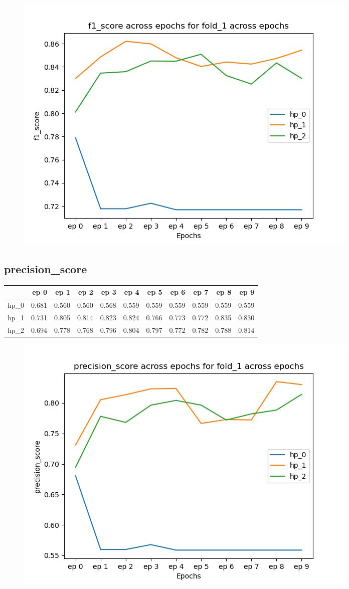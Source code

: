 \documentclass{article}
\begin{document}
\begin{figure}[H]
\includegraphics[scale = 0.75]{fold_1/f1_score}
\end{figure}
\subsection{precision\_score}
\begin{tabular}{lrrrrrrrrrr}
\toprule
{} &   ep 0 &   ep 1 &   ep 2 &   ep 3 &   ep 4 &   ep 5 &   ep 6 &   ep 7 &   ep 8 &   ep 9 \\
\midrule
hp\_0 &  0.681 &  0.560 &  0.560 &  0.568 &  0.559 &  0.559 &  0.559 &  0.559 &  0.559 &  0.559 \\
hp\_1 &  0.731 &  0.805 &  0.814 &  0.823 &  0.824 &  0.766 &  0.773 &  0.772 &  0.835 &  0.830 \\
hp\_2 &  0.694 &  0.778 &  0.768 &  0.796 &  0.804 &  0.797 &  0.772 &  0.782 &  0.788 &  0.814 \\
\bottomrule
\end{tabular}

\begin{figure}[H]
\includegraphics[scale = 0.75]{fold_1/precision_score}
\end{figure}
\end{document}
